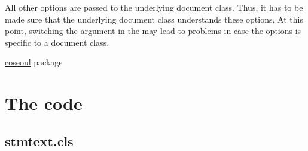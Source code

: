 \documentclass[%
  type=article,%
  layout=koma,%
  page=false,%
  hyperref=true,%
  cleveref=true,%
  conditionallox=true,%
  conditionalloxnewpage=true,%
  date=true,%
  glossaries=true,%
  index=true,%
  listings=true%
]{stmtext}
\begin{document}



\label{sec:options:type}



All other options are passed to the underlying document class. Thus, it has to be made sure that the underlying document class understands these options. At this point, switching the argument in the  may lead to problems in case the options is specific to a document class.

\setcounter{currentlevel}{\basetoclevelnr}
\label{sec:usage}


\href{https://ctan.org/tex-archive/macros/latex/contrib/coseoul}{coseoul} package

\printstmacronyms

\printstmindex

\newpage
\appendix

\section{The code}

\subsection{stmtext.cls}


\end{document}
